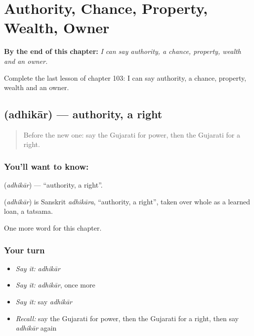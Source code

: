 
\chapter{Authority, Chance, Property, Wealth, Owner}
\label{ch:gu-authority-chance-property-wealth-owner}

\begin{chapteropening}
\textbf{By the end of this chapter:} \emph{I can say authority, a chance, property, wealth and an owner.}

Complete the last lesson of chapter 103: I can say authority, a chance, property, wealth and an owner.
\end{chapteropening}

\section[\texorpdfstring{\gu{અધિકાર} (adhikār)}{અધિકાર (adhikār)}]{ (adhikār) — authority, a right}

\label{lesson:GU-C103-adhikar}



\begin{quote}
Before the new one: say the Gujarati for power, then the Gujarati for a right.
\end{quote}

\subsection*{You'll want to know: }
\textbf{} (\emph{adhikār}) — \textquotedblleft{}authority, a right\textquotedblright{}.

\begin{cousinweb}
\textbf{} (\emph{adhikār}) is Sanskrit \emph{adhikāra}, \textquotedblleft{}authority, a right\textquotedblright{}, taken over whole as a learned loan, a tatsama.
\end{cousinweb}

\begin{grammarlens}[title={What you've built}]
One more word for this chapter.
\end{grammarlens}

\subsection*{Your turn}
\begin{itemize}
\raggedright
  \item \emph{Say it:} \emph{adhikār}
  \item \emph{Say it:} \emph{adhikār}, once more
  \item \emph{Say it:} say \emph{adhikār}
  \item \emph{Recall:} say the Gujarati for power, then the Gujarati for a right, then say \emph{adhikār} again
\end{itemize}

